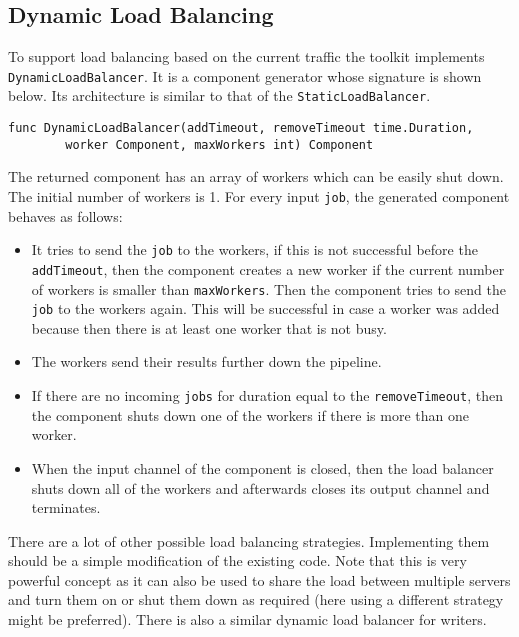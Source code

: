 \subsection{Dynamic Load Balancing}
To support load balancing based on the current traffic the toolkit implements
\texttt{DynamicLoadBalancer}. It is a component generator whose signature is
shown below. Its architecture is similar
to that of the \texttt{StaticLoadBalancer}.
\begin{lstlisting}
func DynamicLoadBalancer(addTimeout, removeTimeout time.Duration, 
        worker Component, maxWorkers int) Component
\end{lstlisting}
The returned component has an array of workers which can be easily shut down.
The initial number of workers is 1. 
For every input \texttt{job}, the generated component behaves as follows:
\begin{itemize}
	\item It tries to send the \texttt{job} to the workers, if this is not
          successful before the \texttt{addTimeout}, then the component 
          creates a new worker if the current number of workers is smaller 
          than \texttt{maxWorkers}. Then the component tries to send the 
          \texttt{job} to the workers again. This will be successful in 
          case a worker was added because then there is at least one 
          worker that is not busy.

	\item The workers send their results further down the pipeline.

	\item If there are no incoming \texttt{jobs} for duration equal to the 
          \texttt{removeTimeout}, then the component shuts down one 
          of the workers if there is more than one worker.

	\item When the input channel of the component is closed, then 
          the load balancer shuts down all of the workers and afterwards 
          closes its output channel and terminates.
\end{itemize}
There are a lot of other possible load balancing strategies. 
Implementing them should be a simple modification of the existing code.
Note that this is very powerful concept as it can also be used to share
the load between multiple servers and turn them on or shut them down as
required (here using a different strategy might be preferred). There is
also a similar dynamic load balancer for writers.

